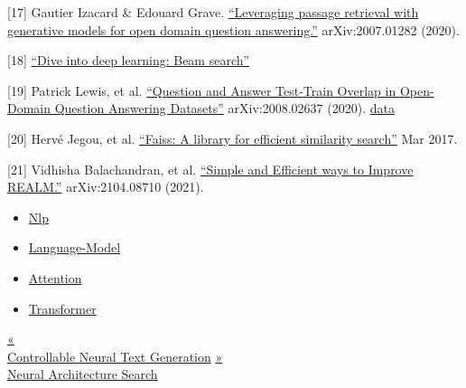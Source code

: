 {[}17{]} Gautier Izacard \& Edouard Grave. \href{https://arxiv.org/abs/2007.01282}{``Leveraging passage retrieval with generative models for open domain question answering.''} arXiv:2007.01282 (2020).

{[}18{]} \href{https://d2l.ai/chapter_recurrent-modern/beam-search.html}{``Dive into deep learning: Beam search''}

{[}19{]} Patrick Lewis, et al. \href{https://arxiv.org/abs/2008.02637}{``Question and Answer Test-Train Overlap in Open-Domain Question Answering Datasets''} arXiv:2008.02637 (2020). \textbar{} \href{https://github.com/facebookresearch/QA-Overlap}{data}

{[}20{]} Hervé Jegou, et al. \href{https://engineering.fb.com/2017/03/29/data-infrastructure/faiss-a-library-for-efficient-similarity-search/}{``Faiss: A library for efficient similarity search''} Mar 2017.

{[}21{]} Vidhisha Balachandran, et al. \href{https://arxiv.org/abs/2104.08710}{``Simple and Efficient ways to Improve REALM.''} arXiv:2104.08710 (2021).

\begin{itemize}
\tightlist
\item
  \href{https://lilianweng.github.io/tags/nlp/}{Nlp}
\item
  \href{https://lilianweng.github.io/tags/language-model/}{Language-Model}
\item
  \href{https://lilianweng.github.io/tags/attention/}{Attention}
\item
  \href{https://lilianweng.github.io/tags/transformer/}{Transformer}
\end{itemize}

\href{https://lilianweng.github.io/posts/2021-01-02-controllable-text-generation/}{{« }\\
{Controllable Neural Text Generation}} \href{https://lilianweng.github.io/posts/2020-08-06-nas/}{{ »}\\
{Neural Architecture Search}}

